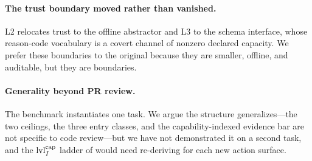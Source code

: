 \paragraph{The trust boundary moved rather than vanished.} L2 relocates trust
to the offline abstractor and L3 to the schema interface, whose reason-code
vocabulary is a covert channel of nonzero declared capacity. We prefer these
boundaries to the original because they are smaller, offline, and auditable,
but they are boundaries.

\paragraph{Generality beyond PR review.} The benchmark instantiates one task.
We argue the structure generalizes---the two ceilings, the three entry classes,
and the capability-indexed evidence bar are not specific to code
review---but we have not demonstrated it on a second task, and the
$\mathrm{lvl}_I^{\mathrm{cap}}$ ladder of  would need re-deriving
for each new action surface.
